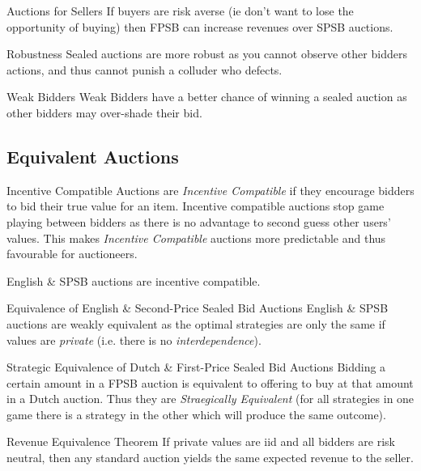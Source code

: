 \documentclass[11pt,a4paper]{article}
\begin{document}
\begin{remark}{Auctions for Sellers}
  If buyers are risk averse (ie don't want to lose the opportunity of buying) then FPSB can increase revenues over SPSB auctions.
\end{remark}

\begin{remark}{Robustness}
  Sealed auctions are more robust as you cannot observe other bidders actions, and thus cannot punish a colluder who defects.
\end{remark}

\begin{remark}{Weak Bidders}
  Weak Bidders have a better chance of winning a sealed auction as other bidders may over-shade their bid.
\end{remark}

\subsection{Equivalent Auctions}

\begin{definition}{Incentive Compatible}
  Auctions are \textit{Incentive Compatible} if they encourage bidders to bid their true value for an item. Incentive compatible auctions stop game playing between bidders as there is no advantage to second guess other users' values. This makes \textit{Incentive Compatible} auctions more predictable and thus favourable for auctioneers.
  \par English \& SPSB auctions are incentive compatible.
\end{definition}

\begin{remark}{Equivalence of English \& Second-Price Sealed Bid Auctions}
  English \& SPSB auctions are weakly equivalent as the optimal strategies are only the same if values are \textit{private} (i.e. there is no \textit{interdependence}).
\end{remark}

\begin{remark}{Strategic Equivalence of Dutch \& First-Price Sealed Bid Auctions}
  Bidding a certain amount in a FPSB auction is equivalent to offering to buy at that amount in a Dutch auction. Thus they are \textit{Straegically Equivalent} (for all strategies in one game there is a strategy in the other which will produce the same outcome).
\end{remark}

\begin{theorem}{Revenue Equivalence Theorem}
  If private values are iid and all bidders are risk neutral, then any standard auction yields the same expected revenue to the seller.
\end{theorem}
\end{document}
